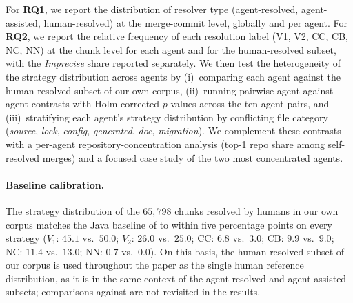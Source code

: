 \documentclass[sigconf,anonymous]{acmart}
\begin{document}
For \textbf{RQ1}, we report the distribution of resolver type (agent-resolved, agent-assisted, human-resolved) at the merge-commit level, globally and per agent. For \textbf{RQ2}, we report the relative frequency of each resolution label (V1, V2, CC, CB, NC, NN) at the chunk level for each agent and for the human-resolved subset, with the \textit{Imprecise} share reported separately. We then test the heterogeneity of the strategy distribution across agents by (i)~comparing each agent against the human-resolved subset of our own corpus, (ii)~running pairwise agent-against-agent contrasts with Holm-corrected $p$-values across the ten agent pairs, and (iii)~stratifying each agent's strategy distribution by conflicting file category (\emph{source}, \emph{lock}, \emph{config}, \emph{generated}, \emph{doc}, \emph{migration}). We complement these contrasts with a per-agent repository-concentration analysis (top-1 repo share among self-resolved merges) and a focused case study of the two most concentrated agents.

\paragraph{Baseline calibration.} The strategy distribution of the $65{,}798$ \linebreak chunks resolved by humans in our own corpus matches the Java baseline of \citet{ghiotto2020nature} to within five percentage points on every strategy ($V_1$: $45.1$ vs.\ $50.0$; $V_2$: $26.0$ vs.\ $25.0$; CC: $6.8$ vs.\ $3.0$; CB: $9.9$ vs.\ $9.0$; NC: $11.4$ vs.\ $13.0$; NN: $0.7$ vs.\ $0.0$). On this basis, the human-resolved subset of our corpus is used throughout the paper as the single human reference distribution, as it is in the same context of the agent-resolved and agent-assisted subsets; comparisons against \citet{ghiotto2020nature} are not revisited in the results.
\end{document}
